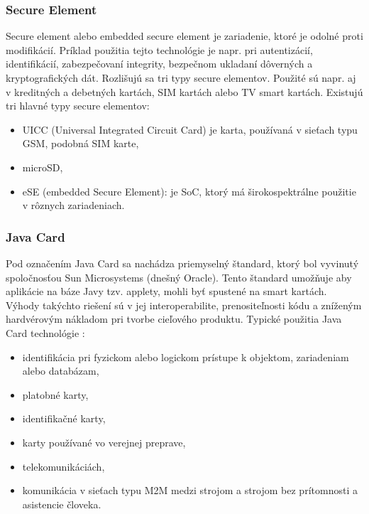 \documentclass[12pt,a4paper,oneside,openright]{report}
\begin{document}
\subsubsection{Secure Element} \label{s_se}
Secure element alebo embedded secure element je zariadenie, ktoré je odolné proti modifikácií. Príklad použitia tejto technológie je napr. pri autentizácií, identifikácií, zabezpečovaní integrity, bezpečnom ukladaní dôverných a kryptografických dát. Rozlišujú sa tri typy secure elementov. Použité sú napr. aj v kreditných a debetných kartách, SIM kartách alebo TV smart kartách. \cite{gp}\cite{gemalto}
Existujú tri hlavné typy secure elementov:
\begin{itemize}
	\item UICC (Universal Integrated Circuit Card) je karta, používaná v sieťach typu GSM, podobná SIM karte,
	\item microSD,
	\item eSE (embedded Secure Element): je SoC, ktorý má širokospektrálne použitie v rôznych zariadeniach.
\end{itemize}
\onehalfspacing

\subsubsection{Java Card} \label{s_jc}
Pod označením Java Card sa nachádza priemyselný štandard, ktorý bol vyvinutý \\ spoločnosťou Sun Microsystems (dnešný Oracle). Tento štandard umožňuje aby aplikácie na báze Javy tzv. applety, mohli byť spustené na smart kartách. Výhody takýchto riešení sú v jej interoperabilite, prenositeľnosti kódu a zníženým hardvérovým nákladom pri tvorbe cieľového produktu.
Typické použitia Java Card technológie \cite{jcop}:
\begin{itemize}
	\item identifikácia pri fyzickom alebo logickom prístupe k objektom, zariadeniam alebo databázam,
	\item platobné karty,
	\item identifikačné karty,
	\item karty používané vo verejnej preprave,
	\item telekomunikáciách,
	\item komunikácia v sieťach typu M2M medzi strojom a strojom bez prítomnosti a asistencie človeka.
\end{itemize}
\onehalfspacing
\end{document}
